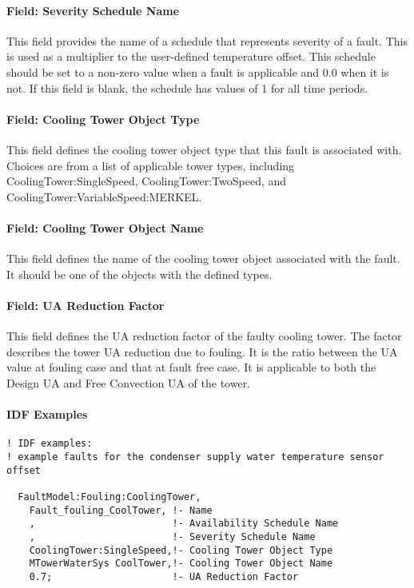\paragraph{Field: Severity Schedule Name}\label{field-severity-schedule-name}

This field provides the name of a schedule that represents severity of a fault. This is used as a multiplier to the user-defined temperature offset. This schedule should be set to a non-zero value when a fault is applicable and 0.0 when it is not. If this field is blank, the schedule has values of 1 for all time periods.

\paragraph{Field: Cooling Tower Object Type}\label{field-tower-object-type}

This field defines the cooling tower object type that this fault is associated with. Choices are from a list of applicable tower types, including CoolingTower:SingleSpeed, CoolingTower:TwoSpeed, and CoolingTower:VariableSpeed:MERKEL.

\paragraph{Field: Cooling Tower Object Name}\label{field-tower-object-name}

This field defines the name of the cooling tower object associated with the fault. It should be one of the objects with the defined types.

\paragraph{Field: UA Reduction Factor}\label{field-ua-reduction-factor}

This field defines the UA reduction factor of the faulty cooling tower. The factor describes the tower UA reduction due to fouling. It is the ratio between the UA value at fouling case and that at fault free case. It is applicable to both the Design UA and Free Convection UA of the tower.

\paragraph{IDF Examples}

\begin{lstlisting}
! IDF examples:
! example faults for the condenser supply water temperature sensor offset

  FaultModel:Fouling:CoolingTower,
    Fault_fouling_CoolTower, !- Name
    ,                        !- Availability Schedule Name
    ,                        !- Severity Schedule Name
    CoolingTower:SingleSpeed,!- Cooling Tower Object Type
    MTowerWaterSys CoolTower,!- Cooling Tower Object Name
    0.7;                     !- UA Reduction Factor

\end{lstlisting}

